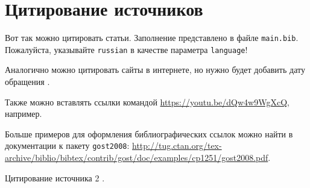\section{Цитирование источников}

Вот так \cite{Article} можно цитировать статьи. 
Заполнение представлено в файле \texttt{main.bib}. 
Пожалуйста, указывайте \texttt{russian} в качестве параметра \texttt{language}!

Аналогично можно цитировать сайты в интернете, но нужно будет добавить 
дату обращения \cite{Wikipedia}.

Также можно вставлять ссылки командой \url{https://youtu.be/dQw4w9WgXcQ}, например.

Больше примеров для оформления библиографических ссылок можно найти в 
документации к пакету \texttt{gost2008}: 
\url{http://tug.ctan.org/tex-archive/biblio/bibtex/contrib/gost/doc/examples/cp1251/gost2008.pdf}.

\lipsum[1-2]

Цитирование источника 2 \cite{cite_1_11}.
